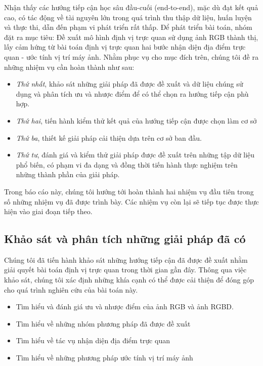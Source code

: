 Nhận thấy các hướng tiếp cận học sâu đầu-cuối (end-to-end), mặc dù đạt kết quả cao, có tác động về tài nguyên lớn trong quá trình thu thập dữ liệu, huấn luyện và thực thi, dẫn đến phạm vi phát triển rất thấp. Để phát triển bài toán, nhóm đặt ra mục tiêu: Đề xuất mô hình định vị trực quan sử dụng ảnh RGB thành thị, lấy cảm hứng từ bài toán định vị trực quan hai bước nhận diện địa điểm trực quan - ước tính vị trí máy ảnh. Nhằm phục vụ cho mục đích trên, chúng tôi đề ra những nhiệm vụ cần hoàn thành như sau:

\begin{itemize}
    \item \textit{Thứ nhất}, khảo sát những giải pháp đã được đề xuất và dữ liệu chúng sử dụng và phân tích ưu và nhược điểm để có thể chọn ra hướng tiếp cận phù hợp.
    \item \textit{Thứ hai}, tiến hành kiểm thử kết quả của hướng tiếp cận được chọn làm cơ sở
    \item \textit{Thứ ba}, thiết kế giải pháp cải thiện dựa trên cơ sở ban đầu.
    \item \textit{Thứ tư}, đánh giá và kiểm thử giải pháp được đề xuất trên những tập dữ liệu phổ biến, có phạm vi đa dạng và đồng thời tiến hành thực nghiệm trên những thành phần của giải pháp.
\end{itemize}

Trong báo cáo này, chúng tôi hướng tới hoàn thành hai nhiệm vụ đầu tiên trong số những nhiệm vụ đã được trình bày. Các nhiệm vụ còn lại sẽ tiếp tục được thực hiện vào giai đoạn tiếp theo.
\newpage
\subsection{Khảo sát và phân tích những giải pháp đã có}

Chúng tôi đã tiến hành khảo sát những hướng tiếp cận đã được đề xuất nhằm giải quyết bài toán định vị trực quan trong thời gian gần đây. Thông qua việc khảo sát, chúng tôi xác định những khía cạnh có thể được cải thiện để đóng góp cho quá trình nghiên cứu của bài toán này.
\begin{itemize}
    \item Tìm hiểu và đánh giá ưu và nhược điểm của ảnh RGB và ảnh RGBD.
    \item Tìm hiểu về những nhóm phương pháp đã được đề xuất
    \item Tìm hiểu về tác vụ nhận diện địa điểm trực quan
    \item Tìm hiểu về những phương pháp ước tính vị trí máy ảnh
\end{itemize}


